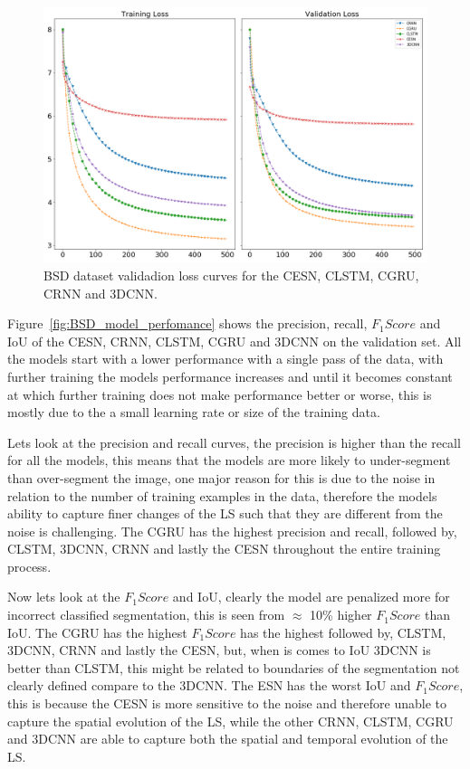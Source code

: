 \documentclass{WitsPhysicsReport}
\begin{document}
\begin{figure}[H]
\centering
  \includegraphics[width=1\textwidth]{Figure/Results/BSR_loss.png}
\caption{BSD dataset validadion loss curves for the CESN, CLSTM, CGRU, CRNN and 3DCNN.} \label{fig:BSD_model_loss}
\end{figure}

Figure~\ref{fig:BSD_model_perfomance} shows the precision, recall, $F_{1}Score$ and IoU of the CESN, CRNN, CLSTM, CGRU and 3DCNN on the validation set. All the models start with a lower performance with a single pass of the data, with further training the models performance increases and until it becomes constant at which further training does not make performance better or worse, this is mostly due to the a small learning rate or size of the training data.

Lets look at the precision and recall curves, the precision is higher than the recall for all the models, this means that the models are more likely to under-segment than over-segment the image, one major reason for this is due to the noise in relation to the number of training examples in the data, therefore the models ability to capture finer changes of the LS such that they are different from the noise is challenging. The CGRU has the highest precision and recall, followed by, CLSTM, 3DCNN, CRNN and lastly the CESN throughout the entire training process. 

Now lets look at the $F_{1}Score$ and IoU, clearly the model are penalized more for incorrect classified segmentation, this is seen from $\approx$ 10\% higher $F_{1}Score$ than IoU. The CGRU has the highest $F_{1}Score$ has the highest  followed by, CLSTM, 3DCNN, CRNN and lastly the CESN, but, when is comes to IoU 3DCNN is better than CLSTM, this might be related to boundaries of the segmentation not clearly defined compare to the 3DCNN. The ESN has the worst IoU and $F_{1}Score$, this is because the CESN is more sensitive to the noise and therefore unable to capture the spatial evolution of the LS, while the other CRNN, CLSTM, CGRU and 3DCNN are able to capture both the spatial and temporal evolution of the LS.
\end{document}

